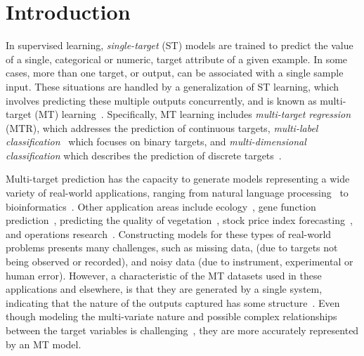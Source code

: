 \documentclass[preprint,12pt]{elsarticle}
\begin{document}
\section{Introduction}
In supervised learning, \textit{single-target} (ST) models are trained to predict the value of a single, categorical or numeric, target attribute of a given example. In some cases, more than one target, or output, can be associated with a single sample input. These situations are handled by a generalization of ST learning, which involves predicting these multiple outputs concurrently, and is known as multi-target (MT) learning~\cite{Aho2012,Borchani2015}. Specifically, MT learning includes \textit{multi-target regression} (MTR), which addresses the prediction of continuous targets, \textit{multi-label classification}~\cite{Zhang20141819} which focuses on binary targets, and \textit{multi-dimensional classification} which describes the prediction of discrete targets~\cite{Borchani2015,Read20141720}. 

Multi-target prediction has the capacity to generate models representing a wide variety of real-world applications, ranging from natural language processing~\cite{Jeong2009} to bioinformatics~\cite{Lui2010}. Other application areas include ecology~\cite{Aho2012}, gene function prediction~\cite{Kocev2015}, predicting the quality of vegetation~\cite{Hadavandi2015-2,Kocev2010}, stock price index forecasting~\cite{Xiong2014}, and operations research~\cite{Borchani2015,Hadavandi2015}. Constructing models for these types of real-world problems presents many challenges, such as missing data, (due to targets not being observed or recorded), and noisy data (due to instrument, experimental or human error). However, a characteristic of the MT datasets used in these applications and elsewhere, is that they are generated by a single system, indicating that the nature of the outputs captured has some structure~\cite{Hadavandi2015}. Even though modeling the multi-variate nature and possible complex relationships between the target variables is challenging~\cite{Borchani2015}, they are more accurately represented by an MT model.%
\end{document}

